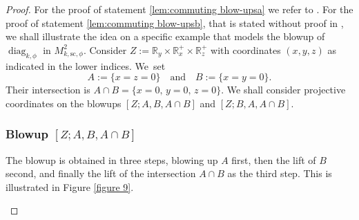 \documentclass[11pt]{article}
\numberwithin{equation}{section}
\theoremstyle{plain}
\theoremstyle{definition}
\newcommand{\R}{{\mathbb{R}}}
\newcommand{\ssc}{{\mathrm{sc}}}
\DeclareMathOperator\diag{diag}
\begin{document}
\begin{proof}
For the proof of statement \eqref{lem:commuting blow-upsa} we refer to \cite[Lem.\,2.1]{analytic-surgery}.
For the proof of statement \eqref{lem:commuting blow-upsb}, that is stated without proof in \cite[Prop.\,5]{Mel-real}, we shall illustrate the idea on a specific example
that models the blowup of $\diag_{k,\phi}$ in $M^2_{k,\ssc,\phi}$. Consider $Z:=\R_y \times \R^+_x \times \R^+_z$
with coordinates $(x,y,z)$ as indicated in the lower indices.
We~set
\[
A:= \{x=z=0\} \quad \text{and} \quad B:= \{x=y=0\}.
\]
Their intersection is $A\cap B = \{x=0,\, y=0,\, z=0\}$. We shall consider projective
coordinates on the blowups $[Z; A, B, A \cap B]$ and $[Z; B, A, A \cap B]$.

\subsubsection*{Blowup $[Z; A, B, A \cap B]$}
The blowup is obtained in three steps, blowing up $A$ first,
then the lift of $B$ second, and finally the lift of the intersection $A\cap B$
as the third step. This is illustrated in Figure \ref{figure 9}.

\begin{figure}[htb]

\end{figure}
\end{proof}
\end{document}
